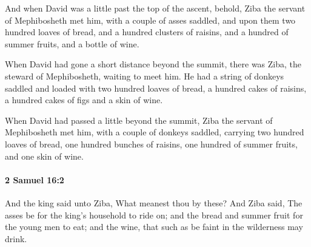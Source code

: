 			\begin{versebox}
					\item[BHS] 
					\item[ASV] And when David was a little past the top of the ascent, behold, Ziba the servant of Mephibosheth met him, with a couple of asses saddled, and upon them two hundred loaves of bread, and a hundred clusters of raisins, and a hundred of summer fruits, and a bottle of wine.
					\item[NIV] When David had gone a short distance beyond the summit, there was Ziba, the steward of Mephibosheth, waiting to meet him. He had a string of donkeys saddled and loaded with two hundred loaves of bread, a hundred cakes of raisins, a hundred cakes of figs and a skin of wine.
					\item[NRSV] When David had passed a little beyond the summit, Ziba the servant of Mephibosheth met him, with a couple of donkeys saddled, carrying two hundred loaves of bread, one hundred bunches of raisins, one hundred of summer fruits, and one skin of wine.
			\end{versebox}

		\paragraph{2 Samuel 16:2} %
			\label{2SAMUEL-16-2}

			And the king said unto Ziba, What meanest thou by these? And Ziba said, The asses be for the king’s household to ride on; and the bread and summer fruit for the young men to eat; and the wine, that such as be faint in the wilderness may drink.

